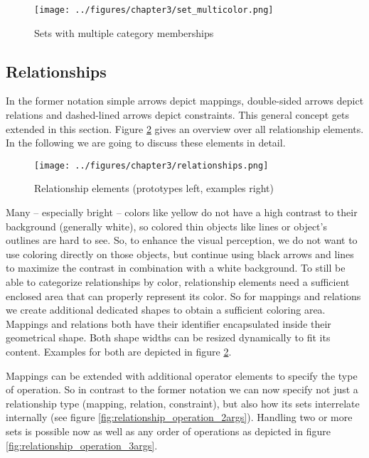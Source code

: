 \documentclass[twoside, openright, 12pt]{book}
\begin{document}
\begin{figure}[!h]
	\centering
	\texttt{[image: ../figures/chapter3/set\_multicolor.png]}
	\caption{Sets with multiple category memberships}
	\label{fig:set_multicolor}
\end{figure}



\subsection{Relationships}
\label{relationships}
In the former notation \citep{Amthor18} simple arrows depict mappings, double-sided arrows depict relations and dashed-lined arrows depict constraints.
This general concept gets extended in this section.
Figure \ref{fig:relationships} gives an overview over all relationship elements.
In the following we are going to discuss these elements in detail.

\begin{figure}[htb]
	\centering
	\texttt{[image: ../figures/chapter3/relationships.png]}
	\caption{Relationship elements (prototypes left, examples right)}
	\label{fig:relationships}
\end{figure}

\noindent
Many -- especially bright -- colors like yellow do not have a high contrast to their background (generally white), so colored thin objects like lines or object's outlines are hard to see.
So, to enhance the visual perception, we do not want to use coloring directly on those objects, but continue using black arrows and lines to maximize the contrast in combination with a white background.
To still be able to categorize relationships by color, relationship elements need a sufficient enclosed area that can properly represent its color.
So for mappings and relations we create additional dedicated shapes to obtain a sufficient coloring area.
Mappings and relations both have their identifier encapsulated inside their geometrical shape.
Both shape widths can be resized dynamically to fit its content.
Examples for both are depicted in figure \ref{fig:relationships}.

Mappings can be extended with additional operator elements to specify the type of operation.
So in contrast to the former notation we can now specify not just a relationship type (mapping, relation, constraint), but also how its sets interrelate internally (see figure \ref{fig:relationship_operation_2args}).
Handling two or more sets is possible now as well as any order of operations as depicted in figure \ref{fig:relationship_operation_3args}.
\end{document}
